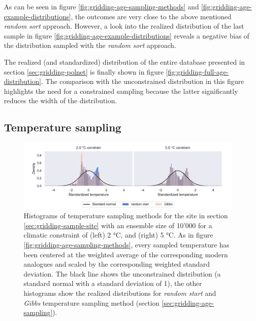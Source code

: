 \begin{refsection}
As can be seen in figure \ref{fig:gridding-age-sampling-methods} and \ref{fig:gridding-age-example-distributions}, the outcomes are very close to the above mentioned \textit{random sort} approach. However, a look into the realized distribution of the last sample in figure \ref{fig:gridding-age-example-distributions} reveals a negative bias of the distribution sampled with the \textit{random sort} approach.

The realized (and standardized) distribution of the entire database presented in section \ref{sec:gridding-polnet} is finally shown in figure \ref{fig:gridding-full-age-distribution}. The comparison with the unconstrained distribution in this figure highlights the need for a constrained sampling because the latter significantly reduces the width of the distribution.

\subsection{Temperature sampling}  \label{sec:gridding-temperature-sampling}

\begin{figure}[h]
	\includegraphics[width=\linewidth]{gridding-figures/temp-sampling-methods-realized.pdf}
	\caption[Scaled histograms of temperature sampling methods]{Histograms of temperature sampling methods for the site in section \ref{sec:gridding-sample-site} with an ensemble size of 10'000 for a climatic constraint of (left) 2 °C, and (right) 5 °C. As in figure \ref{fig:gridding-age-sampling-methods}, every sampled temperature has been centered at the weighted average of the corresponding modern analogues and scaled by the corresponding weighted standard deviation. The black line shows the unconstrained distribution (a standard normal with a standard deviation of 1), the other histograms show the realized distributions for \textit{random start} and \textit{Gibbs} temperature sampling method (section \ref{sec:gridding-age-sampling}).}
	\label{fig:gridding-temp-sampling-methods}
\end{figure}


\end{refsection}
